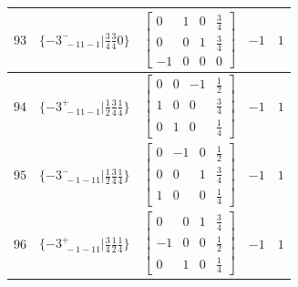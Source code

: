 \documentclass[fleqn,8pt]{jsarticle}
\begin{document}
\begin{longtable}{ccccc}
$ 93 $ & $ \{-3^{-}_{\,\,-11-1}|\frac{3}{4} \frac{3}{4} 0\} $ & $ \begin{bmatrix} 0 & 1 & 0 & \frac{3}{4} \\ 0 & 0 & 1 & \frac{3}{4} \\ -1 & 0 & 0 & 0 \end{bmatrix} $ & $ -1 $ & $ 1 $ \\ \hline
$ 94 $ & $ \{-3^{+}_{\,\,-11-1}|\frac{1}{2} \frac{3}{4} \frac{1}{4}\} $ & $ \begin{bmatrix} 0 & 0 & -1 & \frac{1}{2} \\ 1 & 0 & 0 & \frac{3}{4} \\ 0 & 1 & 0 & \frac{1}{4} \end{bmatrix} $ & $ -1 $ & $ 1 $ \\ \hline
$ 95 $ & $ \{-3^{-}_{\,\,-1-11}|\frac{1}{2} \frac{3}{4} \frac{1}{4}\} $ & $ \begin{bmatrix} 0 & -1 & 0 & \frac{1}{2} \\ 0 & 0 & 1 & \frac{3}{4} \\ 1 & 0 & 0 & \frac{1}{4} \end{bmatrix} $ & $ -1 $ & $ 1 $ \\ \hline
$ 96 $ & $ \{-3^{+}_{\,\,-1-11}|\frac{3}{4} \frac{1}{2} \frac{1}{4}\} $ & $ \begin{bmatrix} 0 & 0 & 1 & \frac{3}{4} \\ -1 & 0 & 0 & \frac{1}{2} \\ 0 & 1 & 0 & \frac{1}{4} \end{bmatrix} $ & $ -1 $ & $ 1 $ \\
\end{longtable}
\end{document}
